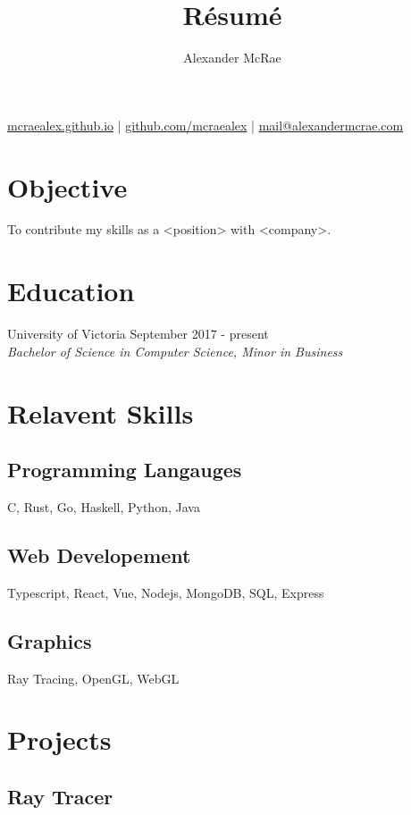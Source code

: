 \documentclass{article}
\makeatletter
\renewcommand{\maketitle}{
\begin{center}
{\huge \bfseries \theauthor}

\vspace{0.25em}
\url{mcraealex.github.io} | \url{github.com/mcraealex} | \href{mailto:mail@alexandermcrae.com}{mail@alexandermcrae.com}
\end{center}}
\newcommand{\hrefColored}[3]{\href{#2}{\color{#1}{#3}}}
\makeatother
\begin{document}
\title{R\'esum\'e}
\author{Alexander McRae}

\maketitle

\section{Objective}

To contribute my skills as a <position> with <company>.

\section{Education}

University of Victoria \hfill September 2017 - present\\
\textit{Bachelor of Science in Computer Science, Minor in Business}

\section{Relavent Skills}

\subsection{Programming Langauges}

C, Rust, Go, Haskell, Python, Java

\subsection{Web Developement}

Typescript, React, Vue, Nodejs, MongoDB, SQL, Express

\subsection{Graphics}

Ray Tracing, OpenGL, WebGL

\section{Projects}

\subsection{Ray Tracer \hrefColored{blue}{https://github.com/McRaeAlex/tiny-raytracer}{github.com/McRaeAlex/tiny-raytracer}}
\end{document}
